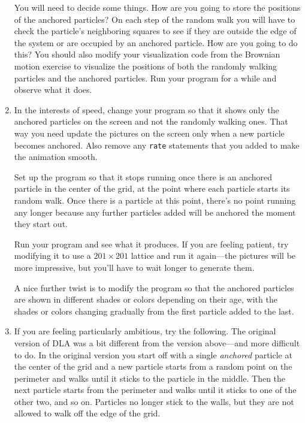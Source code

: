 \documentclass[12pt]{article}
\begin{document}
\begin{exercises}
\begin{enumerate}
  You will need to decide some things.  How are you going to store the
  positions of the anchored particles?  On each step of the random walk you
  will have to check the particle's neighboring squares to see if they are
  outside the edge of the system or are occupied by an anchored particle.
  How are you going to do this?  You should also modify your visualization
  code from the Brownian motion exercise to visualize the positions of both
  the randomly walking particles and the anchored particles.  Run your
  program for a while and observe what it does.

\item In the interests of speed, change your program so that it shows only
  the anchored particles on the screen and not the randomly walking ones.
  That way you need update the pictures on the screen only when a new
  particle becomes anchored.  Also remove any \verb|rate| statements that
  you added to make the animation smooth.

  Set up the program so that it stops running once there is an anchored
  particle in the center of the grid, at the point where each particle
  starts its random walk.  Once there is a particle at this point, there's
  no point running any longer because any further particles added will be
  anchored the moment they start out.

  Run your program and see what it produces.  If you are feeling patient,
  try modifying it to use a $201\times201$ lattice and run it again---the
  pictures will be more impressive, but you'll have to wait longer to
  generate them.

  A nice further twist is to modify the program so that the anchored
  particles are shown in different shades or colors depending on their age,
  with the shades or colors changing gradually from the first particle
  added to the last.

\item If you are feeling particularly ambitious, try the following.  The
  original version of DLA was a bit different from the version above---and
  more difficult to do.  In the original version you start off with a
  single \emph{anchored} particle at the center of the grid and a new
  particle starts from a random point on the perimeter and walks until it
  sticks to the particle in the middle.  Then the next particle starts from
  the perimeter and walks until it sticks to one of the other two, and so
  on.  Particles no longer stick to the walls, but they are not allowed to
  walk off the edge of the grid.


\end{enumerate}
\end{exercises}
\end{document}
